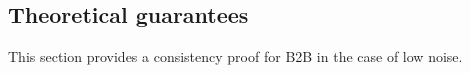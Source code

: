 \documentclass{article}
\begin{document}
\subsection{Theoretical guarantees}
\label{sec:theorem}
%

This section provides a consistency proof for B2B in the case of low noise.
\end{document}
